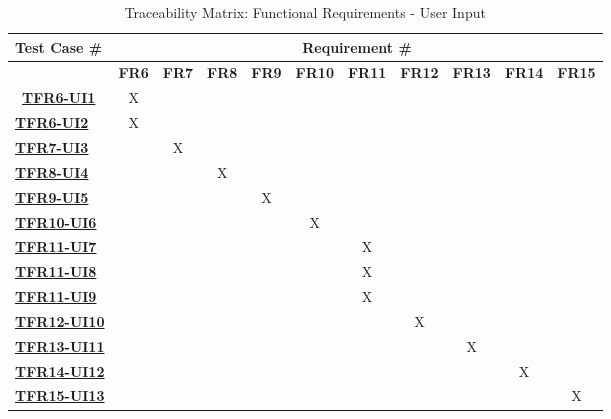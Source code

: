 \documentclass[12pt, titlepage]{article}
\begin{document}
\begin{table}[H]
    \centering
    \begin{adjustbox}{width=1\textwidth}
    \begin{tabular}{l|cccccccccc}
        \textbf{Test Case \#} & \multicolumn{10}{c}{\textbf{Requirement \#}}\\
        \hline
        ~ & \textbf{FR6} & \textbf{FR7} & \textbf{FR8} & \textbf{FR9} & \textbf{FR10} & \textbf{FR11} & \textbf{FR12} & \textbf{FR13} & \textbf{FR14} & \textbf{FR15} \\\
        \hyperref[TFR6-UI1]{\textbf{TFR6-UI1}}  & X & ~ & ~ & ~ & ~ & ~ & ~ & ~ & ~ & ~ \\
        \hyperref[TFR6-UI2]{\textbf{TFR6-UI2}}  & X & ~ & ~ & ~ & ~ & ~ & ~ & ~ & ~ & ~ \\
        \hyperref[TFR7-UI3]{\textbf{TFR7-UI3}}  & ~ & X & ~ & ~ & ~ & ~ & ~ & ~ & ~ & ~ \\
        \hyperref[TFR8-UI4]{\textbf{TFR8-UI4}}  & ~ & ~ & X & ~ & ~ & ~ & ~ & ~ & ~ & ~ \\
        \hyperref[TFR9-UI5]{\textbf{TFR9-UI5}}  & ~ & ~ & ~ & X & ~ & ~ & ~ & ~ & ~ & ~ \\
        \hyperref[TFR10-UI6]{\textbf{TFR10-UI6}}   & ~ & ~ & ~ & ~ & X & ~ & ~ & ~ & ~ & ~ \\
        \hyperref[TFR11-UI7]{\textbf{TFR11-UI7}}   & ~ & ~ & ~ & ~ & ~ & X & ~ & ~ & ~ & ~ \\
        \hyperref[TFR11-UI8]{\textbf{TFR11-UI8}}   & ~ & ~ & ~ & ~ & ~ & X & ~ & ~ & ~ & ~ \\
        \hyperref[TFR11-UI9]{\textbf{TFR11-UI9}}   & ~ & ~ & ~ & ~ & ~ & X & ~ & ~ & ~ & ~ \\
        \hyperref[TFR12-UI10]{\textbf{TFR12-UI10}}   & ~ & ~ & ~ & ~ & ~ & ~ & X & ~ & ~ & ~ \\
        \hyperref[TFR13-UI11]{\textbf{TFR13-UI11}}   & ~ & ~ & ~ & ~ & ~ & ~ & ~ & X & ~ & ~ \\
        \hyperref[TFR14-UI12]{\textbf{TFR14-UI12}}   & ~ & ~ & ~ & ~ & ~ & ~ & ~ & ~ & X & ~ \\
        \hyperref[TFR15-UI13]{\textbf{TFR15-UI13}}   & ~ & ~ & ~ & ~ & ~ & ~ & ~ & ~ & ~ & X \\
    \end{tabular}
    \end{adjustbox}
    \caption{Traceability Matrix: Functional Requirements - User Input}
    \label{Traceability Matrix: Functional Requirements - User Input}
\end{table}
\end{document}
